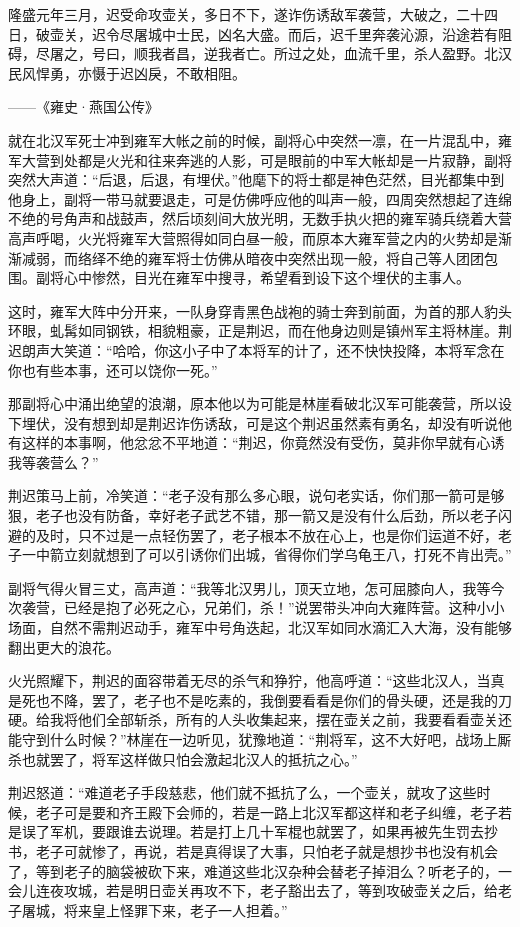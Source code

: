 隆盛元年三月，迟受命攻壶关，多日不下，遂诈伤诱敌军袭营，大破之，二十四日，破壶关，迟令尽屠城中士民，凶名大盛。而后，迟千里奔袭沁源，沿途若有阻碍，尽屠之，号曰，顺我者昌，逆我者亡。所过之处，血流千里，杀人盈野。北汉民风悍勇，亦慑于迟凶戾，不敢相阻。

——《雍史·燕国公传》

就在北汉军死士冲到雍军大帐之前的时候，副将心中突然一凛，在一片混乱中，雍军大营到处都是火光和往来奔逃的人影，可是眼前的中军大帐却是一片寂静，副将突然大声道：“后退，后退，有埋伏。”他麾下的将士都是神色茫然，目光都集中到他身上，副将一带马就要退走，可是仿佛呼应他的叫声一般，四周突然想起了连绵不绝的号角声和战鼓声，然后顷刻间大放光明，无数手执火把的雍军骑兵绕着大营高声呼喝，火光将雍军大营照得如同白昼一般，而原本大雍军营之内的火势却是渐渐减弱，而络绎不绝的雍军将士仿佛从暗夜中突然出现一般，将自己等人团团包围。副将心中惨然，目光在雍军中搜寻，希望看到设下这个埋伏的主事人。

这时，雍军大阵中分开来，一队身穿青黑色战袍的骑士奔到前面，为首的那人豹头环眼，虬髯如同钢铁，相貌粗豪，正是荆迟，而在他身边则是镇州军主将林崖。荆迟朗声大笑道：“哈哈，你这小子中了本将军的计了，还不快快投降，本将军念在你也有些本事，还可以饶你一死。”

那副将心中涌出绝望的浪潮，原本他以为可能是林崖看破北汉军可能袭营，所以设下埋伏，没有想到却是荆迟诈伤诱敌，可是这个荆迟虽然素有勇名，却没有听说他有这样的本事啊，他忿忿不平地道：“荆迟，你竟然没有受伤，莫非你早就有心诱我等袭营么？”

荆迟策马上前，冷笑道：“老子没有那么多心眼，说句老实话，你们那一箭可是够狠，老子也没有防备，幸好老子武艺不错，那一箭又是没有什么后劲，所以老子闪避的及时，只不过是一点轻伤罢了，老子根本不放在心上，也是你们运道不好，老子一中箭立刻就想到了可以引诱你们出城，省得你们学乌龟王八，打死不肯出壳。”

副将气得火冒三丈，高声道：“我等北汉男儿，顶天立地，怎可屈膝向人，我等今次袭营，已经是抱了必死之心，兄弟们，杀！”说罢带头冲向大雍阵营。这种小小场面，自然不需荆迟动手，雍军中号角迭起，北汉军如同水滴汇入大海，没有能够翻出更大的浪花。

火光照耀下，荆迟的面容带着无尽的杀气和狰狞，他高呼道：“这些北汉人，当真是死也不降，罢了，老子也不是吃素的，我倒要看看是你们的骨头硬，还是我的刀硬。给我将他们全部斩杀，所有的人头收集起来，摆在壶关之前，我要看看壶关还能守到什么时候？”林崖在一边听见，犹豫地道：“荆将军，这不大好吧，战场上厮杀也就罢了，将军这样做只怕会激起北汉人的抵抗之心。”

荆迟怒道：“难道老子手段慈悲，他们就不抵抗了么，一个壶关，就攻了这些时候，老子可是要和齐王殿下会师的，若是一路上北汉军都这样和老子纠缠，老子若是误了军机，要跟谁去说理。若是打上几十军棍也就罢了，如果再被先生罚去抄书，老子可就惨了，再说，若是真得误了大事，只怕老子就是想抄书也没有机会了，等到老子的脑袋被砍下来，难道这些北汉杂种会替老子掉泪么？听老子的，一会儿连夜攻城，若是明日壶关再攻不下，老子豁出去了，等到攻破壶关之后，给老子屠城，将来皇上怪罪下来，老子一人担着。”

